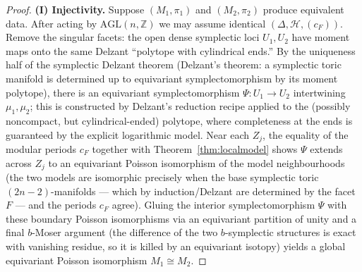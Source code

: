 \documentclass{amsart}
\theoremstyle{definition}
\begin{document}
\begin{proof}
\medskip
\noindent\textbf{(I) Injectivity.}
Suppose $(M_1,\pi_1)$ and $(M_2,\pi_2)$ produce equivalent data. After acting
by $\mathrm{AGL}(n,\mathbb Z)$ we may assume identical
$(\Delta,\mathcal H,(c_F))$. Remove the singular facets: the open dense
symplectic loci $U_1,U_2$ have moment maps onto the same Delzant ``polytope
with cylindrical ends.'' By the uniqueness half of the symplectic Delzant
theorem (Delzant's theorem: a symplectic toric manifold is determined up to
equivariant symplectomorphism by its moment polytope), there is an equivariant
symplectomorphism $\Psi\colon U_1\to U_2$ intertwining $\mu_1,\mu_2$; this is
constructed by Delzant's reduction recipe applied to the (possibly noncompact,
but cylindrical-ended) polytope, where completeness at the ends is guaranteed
by the explicit logarithmic model. Near each $Z_j$, the equality of the modular
periods $c_{F}$ together with Theorem~\ref{thm:localmodel} shows $\Psi$ extends
across $Z_j$ to an equivariant Poisson isomorphism of the model neighbourhoods
(the two models are isomorphic precisely when the base symplectic toric
$(2n-2)$-manifolds --- which by induction/Delzant are determined by the facet
$F$ --- and the periods $c_F$ agree). Gluing the interior symplectomorphism
$\Psi$ with these boundary Poisson isomorphisms via an equivariant partition of
unity and a final $b$-Moser argument (the difference of the two $b$-symplectic
structures is exact with vanishing residue, so it is killed by an equivariant
isotopy) yields a global equivariant Poisson isomorphism $M_1\cong M_2$.


\end{proof}
\end{document}
